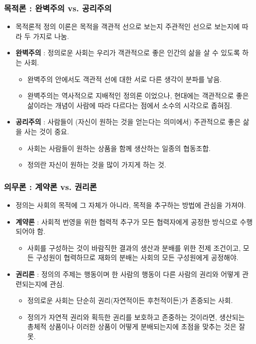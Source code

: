 \documentclass[aspectratio=169,xcolor=dvipsnames,handout]{beamer}
\begin{document}
\begin{frame}[<+->]
\frametitle{목적론 : 완벽주의 vs. 공리주의}
    \begin{itemize}
        \item  목적론적 정의 이론은 목적을 객관적 선으로 보는지 주관적인 선으로 보는지에 따라 두 가지로 나눔.
        \item \textbf{완벽주의} : 정의로운 사회는 우리가 객관적으로 좋은 인간의 삶을 살 수 있도록 하는 사회.
        \begin{itemize}
            \item 완벽주의 안에서도 객관적 선에 대한 서로 다른 생각이 분파를 낳음.
            \item 완벽주의는 역사적으로 지배적인 정의론 이었으나, 현대에는 객관적으로 좋은 삶이라는 개념이 사람에 따라 다르다는 점에서 소수의 시각으로 좁혀짐.
        \end{itemize}
        \item \textbf{공리주의} : 사람들이 (자신이 원하는 것을 얻는다는 의미에서) 주관적으로 좋은 삶을 사는 것이 중요.
        \begin{itemize}
        \item 사회는 사람들이 원하는 상품을 함께 생산하는 일종의 협동조합.
        \item 정의란 자신이 원하는 것을 많이 가지게 하는 것.
        \end{itemize}
    \end{itemize}
\end{frame}

\begin{frame}[<+->]
\frametitle{의무론 : 계약론 vs. 권리론}
    \begin{itemize}
        \item 정의는  사회의 목적에 그 자체가 아니라, 목적을 추구하는 방법에 관심을 가져야.
        \item \textbf{계약론} : 사회적 번영을 위한 협력적 추구가 모든 협력자에게 공정한 방식으로 수행되어야 함.
        \begin{itemize}
            \item 사회를 구성하는 것이 바람직한 결과의 생산과 분배를 위한 전제 조건이고, 모든 구성원이 협력하므로 재화의 분배는 사회의 모든 구성원에게 공정해야.
        \end{itemize}
        \item \textbf{권리론} : 정의의 주제는 행동이며 한 사람의 행동이 다른 사람의 권리와 어떻게 관련되는지에 관심.
        \begin{itemize}
            \item 정의로운 사회는 단순히 권리(자연적이든 후천적이든)가 존중되는 사회.
            \item 정의가 자연적 권리와 획득한 권리를 보호하고 존중하는 것이라면, 생산되는 총체적 상품이나 이러한 상품이 어떻게 분배되는지에 초점을 맞추는 것은 잘못.
        \end{itemize}
    \end{itemize}
\end{frame}
\end{document}
